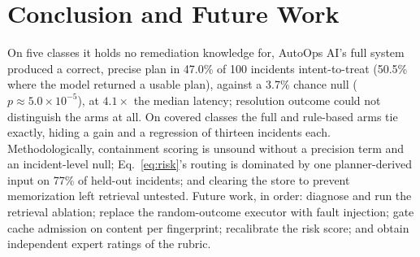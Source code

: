 \documentclass[conference]{IEEEtran}
\begin{document}
\section{Conclusion and Future Work}
On five classes it holds no remediation knowledge for, AutoOps AI's full
system produced a correct, precise plan in 47.0\% of 100 incidents
intent-to-treat (50.5\% where the model returned a usable plan), against
a 3.7\% chance null ($p\approx5.0\times10^{-5}$), at $4.1\times$ the median
latency; resolution outcome could not distinguish the arms at all. On
covered classes the full and rule-based arms tie exactly, hiding a gain
and a regression of thirteen incidents each. Methodologically,
containment scoring is unsound without a precision term and an
incident-level null; Eq.~\eqref{eq:risk}'s routing is dominated by one
planner-derived input on 77\% of held-out incidents; and clearing the store to
prevent memorization left retrieval untested. Future work, in order:
diagnose and run the retrieval ablation; replace the random-outcome
executor with fault injection; gate cache admission on content per
fingerprint; recalibrate the risk score; and obtain independent expert
ratings of the rubric.
\end{document}
